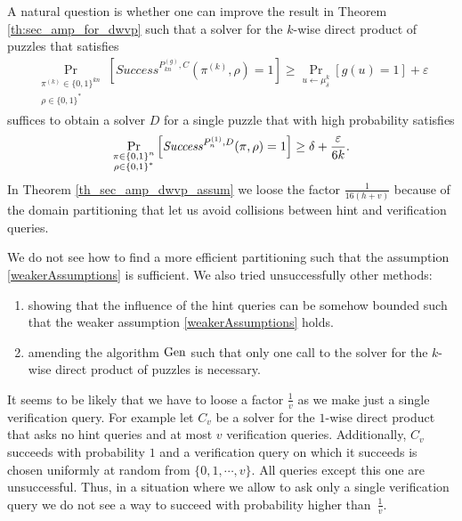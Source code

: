 A natural question is whether one can improve the result in Theorem \ref{th:sec_amp_for_dwvp} such that a solver
for the $k$-wise direct product of puzzles that satisfies
\begin{align}
    \label{weakerAssumptions}
    \underset{\substack{\pi^{(k)} \in \{0,1\}^{kn} \\ \rho \in \{0,1\}^{*}}}{\Pr}\left[\mathit{Success}^{P_{kn}^{(g)}, C}(\pi^{(k)}, \rho) = 1\right]
    \geq \underset{u \leftarrow \mu_\delta^k}{\Pr}[g(u) = 1] + \varepsilon
\end{align}
suffices to obtain a solver $D$ for a single puzzle that with high probability satisfies
  \begin{align}
    \underset{\substack{\pi \in \{0,1\}^{n} \\ \rho \in \{0,1\}^{*}}}
    {\Pr}\left[\operatorname{\mathit{Success}}^{P_{n}^{(1)},D}(\pi, \rho) = 1\right] \geq \delta + \frac{\varepsilon}{6k}.
  \end{align}
In Theorem \ref{th_sec_amp_dwvp_assum} we loose the factor $\frac{1}{16(h+v)}$ because of the domain partitioning that let us avoid collisions between hint and verification queries.

We do not see how to find a more efficient partitioning such that the assumption \eqref{weakerAssumptions} is sufficient.
We also tried unsuccessfully other methods:
\begin{enumerate}[]
  \item showing that the influence of the hint queries can be somehow bounded such that the weaker assumption \eqref{weakerAssumptions} holds. \\
  \item amending the algorithm $\operatorname{\text{Gen}}$ such that only one call to the solver for the $k$-wise direct product of puzzles is necessary.
\end{enumerate}

It seems to be likely that we have to loose a factor $\frac{1}{v}$ as we make just a single verification query.
For example let $C_v$ be a solver for the $1$-wise direct product that asks no hint queries and at most $v$ verification queries.
Additionally, $C_v$ succeeds with probability $1$ and a verification query on which it succeeds is chosen uniformly at random from $\{0,1, \cdots, v\}$.
All queries except this one are unsuccessful.
Thus, in a situation where we allow to ask only a single verification query we do not see a way to succeed with probability higher than~$\frac{1}{v}$.

